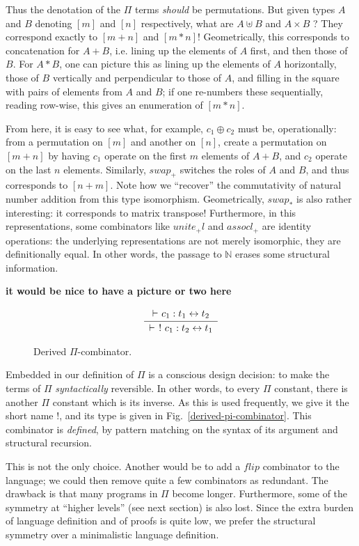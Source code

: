 \documentclass{article}
\newcommand{\identlp}{\mathit{unite}_+\mathit{l}}
\newcommand{\swapp}{\mathit{swap}_+}
\newcommand{\assoclp}{\mathit{assocl}_+}
\newcommand{\swapt}{\mathit{swap}_*}
\newcommand{\iso}{\leftrightarrow}
\newcommand{\proves}{\vdash}
\newcommand{\Rule}[4]{
\makebox{{\rm #1}
$\displaystyle
\frac{\begin{array}{l}#2 \\\end{array}}
{\begin{array}{l}#3      \\\end{array}}$
 #4}}
\newcommand{\jdg}[3]{#2 \proves_{#1} #3}
\newcommand{\jc}[1]{\fbox{Jacques says:} \textbf{#1}}
\newcommand{\fin}[1]{\ensuremath{\left[#1\right]}}
\newcommand{\Nat}{\ensuremath{\mathbb{N}}}
\begin{document}
Thus the denotation of the $\Pi$ terms \emph{should} be permutations. But
given types $A$ and $B$ denoting $\fin{m}$ and $\fin{n}$ respectively,
what are $A \uplus B$ and $A \times B$ ?  They correspond exactly to
$\fin{m+n}$ and $\fin{m*n}$!  Geometrically, this corresponds to
concatenation for $A + B$, i.e. lining up the elements of $A$ first,
and then those of $B$. For $A * B$, one can picture this as
lining up the elements of $A$ horizontally, those of $B$ vertically
and perpendicular to those of $A$, and filling in the square with
pairs of elements from $A$ and $B$; if one re-numbers these sequentially,
reading row-wise, this gives an enumeration of $\fin{m*n}$.

From here, it is easy to see what, for example, $c_1 \oplus c_2$ must be,
operationally: from a permutation on $\fin{m}$ and another on $\fin{n}$,
create a permutation on $\fin{m+n}$ by having $c_1$ operate on the first
$m$ elements of $A+B$, and $c_2$ operate on the last $n$ elements. 
Similarly, $\swapp$ switches the roles of $A$ and $B$, and thus corresponds
to $\fin{n+m}$. Note how we ``recover'' the commutativity of 
natural number addition from this type isomorphism. Geometrically, $\swapt$
is also rather interesting: it corresponds to matrix transpose!
Furthermore, in this representations, some combinators like
$\identlp$ and $\assoclp$ are identity operations: the underlying representations
are not merely isomorphic, they are definitionally equal.
In other words, the passage to $\Nat$ erases some structural information.

\jc{it would be nice to have a picture or two here}

\begin{figure}[t]
\[
\Rule{}
{\jdg{}{}{c_1 : t_1 \iso t_2}}
{\jdg{}{}{\ !\ c_1 : t_2 \iso t_1}}
{}
\]
\caption{Derived $\Pi$-combinator.}
\label{derived-pi-combinators}
\end{figure}

Embedded in our definition of $\Pi$ is a conscious design decision: to make the
terms of $\Pi$ \emph{syntactically} reversible. In other words, to
every $\Pi$ constant, there is another $\Pi$ constant which is its
inverse. As this is used frequently, we give it the short name $!$,
and its type is given in Fig.~\ref{derived-pi-combinator}. This
combinator is \emph{defined}, by pattern matching on the syntax of
its argument and structural recursion.

This is not the only choice.  Another would be to add a
$\mathit{flip}$ combinator to the language; we could then remove
quite a few combinators as redundant. The drawback is that many
programs in $\Pi$ become longer. Furthermore, some of the symmetry
at ``higher levels'' (see next section) is also lost. Since the
extra burden of language definition and of proofs is quite low, we
prefer the structural symmetry over a minimalistic language definition.
\end{document}
